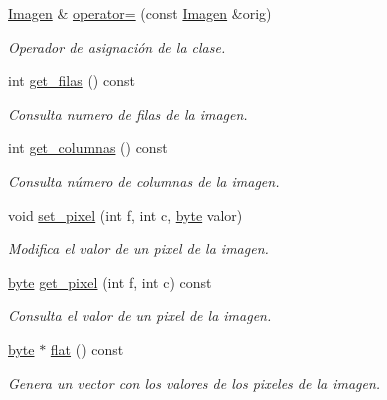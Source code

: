 \begin{DoxyCompactItemize}
\hyperlink{classImagen}{Imagen} \& \hyperlink{classImagen_a9cfdf5f496d78247026783b4026458e8}{operator=} (const \hyperlink{classImagen}{Imagen} \&orig)
\begin{DoxyCompactList}\small\item\em Operador de asignación de la clase. \end{DoxyCompactList}\item 
int \hyperlink{classImagen_a9cfbba6e40009767ec56197631f63d7e}{get\+\_\+filas} () const
\begin{DoxyCompactList}\small\item\em Consulta numero de filas de la imagen. \end{DoxyCompactList}\item 
int \hyperlink{classImagen_a4150d2b82ea80b969ddb8385b83e5485}{get\+\_\+columnas} () const
\begin{DoxyCompactList}\small\item\em Consulta número de columnas de la imagen. \end{DoxyCompactList}\item 
void \hyperlink{classImagen_a5b8399ee72d0f855aa9fd1b3bfd0c4cc}{set\+\_\+pixel} (int f, int c, \hyperlink{imagen_8h_a0c8186d9b9b7880309c27230bbb5e69d}{byte} valor)
\begin{DoxyCompactList}\small\item\em Modifica el valor de un pixel de la imagen. \end{DoxyCompactList}\item 
\hyperlink{imagen_8h_a0c8186d9b9b7880309c27230bbb5e69d}{byte} \hyperlink{classImagen_a12eeea1f5b70fe0cac4a01be5878d97d}{get\+\_\+pixel} (int f, int c) const
\begin{DoxyCompactList}\small\item\em Consulta el valor de un pixel de la imagen. \end{DoxyCompactList}\item 
\hyperlink{imagen_8h_a0c8186d9b9b7880309c27230bbb5e69d}{byte} $\ast$ \hyperlink{classImagen_a0ea022d024c815917e6fa8485583672f}{flat} () const
\begin{DoxyCompactList}\small\item\em Genera un vector con los valores de los pixeles de la imagen. \end{DoxyCompactList}\end{DoxyCompactItemize}
